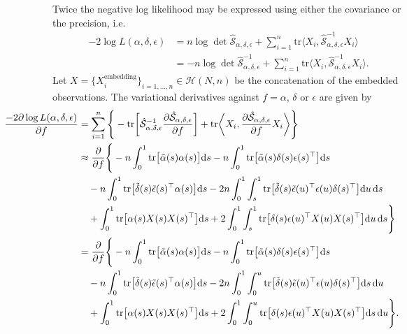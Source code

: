 \documentclass[12pt,a4paper]{article}
\newcommand{\df}{\text{d}}
\newcommand{\tr}{\text{tr}}
\newcommand{\Sop}{\mathcal{S}}
\begin{document}
Twice the negative log likelihood may be expressed using either the covariance or the precision, i.e.\
\begin{align*}
-2\log L(\alpha,\delta,\epsilon) &= n \log\det \hat{\Sop}_{\alpha,\delta,\epsilon} + \sum_{i=1}^n \tr\big\langle X_i, \hat{\Sop}_{\alpha,\delta,\epsilon}^{-1} X_i \big\rangle \\
&= -n \log\det \hat{\Sop}_{\alpha,\delta,\epsilon}^{-1} + \sum_{i=1}^n \tr\big\langle X_i, \hat{\Sop}_{\alpha,\delta,\epsilon}^{-1} X_i \big\rangle.
\end{align*}
Let $X = \{ X_i^{\text{embedding}} \}_{i=1,\dotsc,n} \in \mathcal{H}(N,n)$ be the concatenation of the embedded observations. The variational derivatives against $f=\alpha$, $\delta$ or $\epsilon$ are given by
\begin{equation*}
\hspace{-2cm}
\begin{aligned}
\frac{-2 \partial \log L(\alpha,\delta,\epsilon)}{\partial f} &= \sum_{i=1}^n \Bigg\{ -\tr\bigg[ \hat{\Sop}_{\alpha,\delta,\epsilon}^{-1} \frac{\partial \hat{\Sop}_{\alpha,\delta,\epsilon}}{\partial f} \bigg] + \tr\bigg\langle X_i, \frac{\partial \hat{\Sop}_{\alpha,\delta,\epsilon}}{\partial f} X_i \bigg\rangle \Bigg\} \\
&\approx \frac{\partial}{\partial f} \Bigg\{ -n \int_0^1 \tr\big[ \tilde{\alpha}(s) \alpha(s)\big] \df s - n \int_0^1 \tr\big[ \tilde{\alpha}(s) \delta(s) \epsilon(s)^\top\big] \df s \\
&\quad - n \int_0^1 \tr\big[ \tilde{\delta}(s) \tilde{\epsilon}(s)^\top \alpha(s) \big] \df s - 2n \int_0^1 \int_s^1 \tr\big[ \tilde{\delta}(s) \tilde{\epsilon}(u)^\top \epsilon(u) \delta(s)^\top \big] \df u\, \df s \\
&\quad + \int_0^1 \tr\big[ \alpha(s) X(s) X(s)^\top \big] \df s + 2 \int_0^1 \int_s^1 \tr\big[ \delta(s) \epsilon(u)^\top X(u) X(s)^\top \big] \df u\, \df s \Bigg\} \\
&= \frac{\partial}{\partial f} \Bigg\{ -n \int_0^1 \tr\big[ \tilde{\alpha}(s) \alpha(s)\big] \df s - n \int_0^1 \tr\big[ \tilde{\alpha}(s) \delta(s) \epsilon(s)^\top\big] \df s \\
&\quad - n \int_0^1 \tr\big[ \tilde{\delta}(s) \tilde{\epsilon}(s)^\top \alpha(s) \big] \df s - 2n \int_0^1 \int_0^u \tr\big[ \tilde{\delta}(s) \tilde{\epsilon}(u)^\top \epsilon(u) \delta(s)^\top \big] \df s\, \df u \\
&\quad + \int_0^1 \tr\big[ \alpha(s) X(s) X(s)^\top \big] \df s + 2 \int_0^1 \int_0^u \tr\big[ \delta(s) \epsilon(u)^\top X(u) X(s)^\top \big] \df s\, \df u \Bigg\}.
\end{aligned}
\end{equation*}
\end{document}
